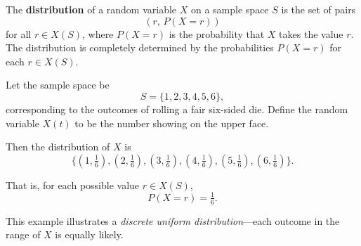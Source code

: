 \begin{defn}[Distribution]
The \textbf{distribution} of a random variable \(X\) on a sample space \(S\) is the set of pairs 
\[
(r,\, P(X = r))
\]
for all \(r \in X(S)\), where \(P(X = r)\) is the probability that \(X\) takes the value \(r\). 
The distribution is completely determined by the probabilities \(P(X = r)\) for each \(r \in X(S)\).
\end{defn}



\begin{exmp}
Let the sample space be
\[
S = \{1, 2, 3, 4, 5, 6\},
\]
corresponding to the outcomes of rolling a fair six-sided die.  
Define the random variable \(X(t)\) to be the number showing on the upper face.

Then the distribution of \(X\) is
\[
\{(1, \tfrac{1}{6}), (2, \tfrac{1}{6}), (3, \tfrac{1}{6}), (4, \tfrac{1}{6}), (5, \tfrac{1}{6}), (6, \tfrac{1}{6})\}.
\]

That is, for each possible value \(r \in X(S)\),
\[
P(X = r) = \tfrac{1}{6}.
\]

This example illustrates a \emph{discrete uniform distribution}—each outcome in the range of \(X\) is equally likely.
\newline
\vspace{1cm}
\end{exmp}



